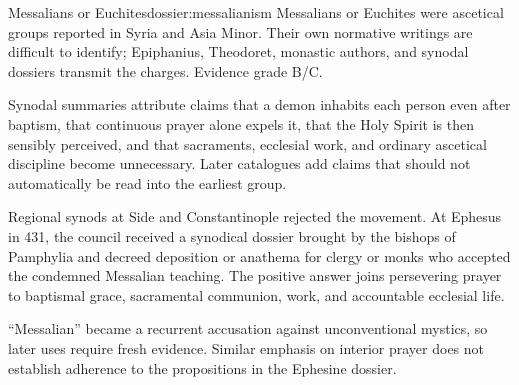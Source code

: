 \begin{heresydossier}{Messalians or Euchites}{dossier:messalianism}
\objectfield Messalians or Euchites were ascetical groups reported in Syria and Asia Minor. Their own normative writings are difficult to identify; Epiphanius, Theodoret, monastic authors, and synodal dossiers transmit the charges. Evidence grade B/C.

\propositionfield Synodal summaries attribute claims that a demon inhabits each person even after baptism, that continuous prayer alone expels it, that the Holy Spirit is then sensibly perceived, and that sacraments, ecclesial work, and ordinary ascetical discipline become unnecessary. Later catalogues add claims that should not automatically be read into the earliest group.

\responsefield Regional synods at Side and Constantinople rejected the movement. At Ephesus in 431, the council received a synodical dossier brought by the bishops of Pamphylia and decreed deposition or anathema for clergy or monks who accepted the condemned Messalian teaching. The positive answer joins persevering prayer to baptismal grace, sacramental communion, work, and accountable ecclesial life.

\aftermathfield ``Messalian'' became a recurrent accusation against unconventional mystics, so later uses require fresh evidence. Similar emphasis on interior prayer does not establish adherence to the propositions in the Ephesine dossier.
\end{heresydossier}

